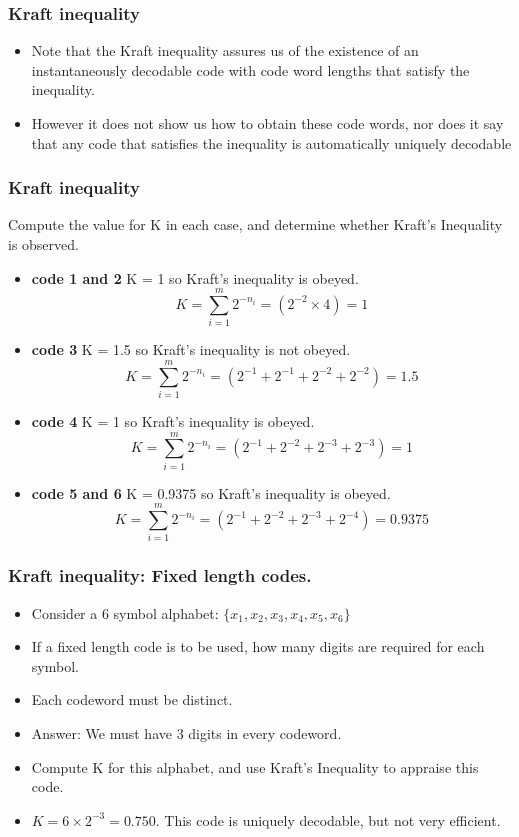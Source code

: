 \documentclass[a4]{beamer}
\begin{document}
\begin{frame}
\frametitle{Kraft inequality}
\begin{itemize}
\item Note that the Kraft inequality assures us of the existence of an instantaneously decodable code
with code word lengths that satisfy the inequality. \item However it does not show us how to obtain these code
words, nor does it say that any code that satisfies the inequality is automatically uniquely decodable
\end{itemize}
\end{frame}




\begin{frame}
\frametitle{Kraft inequality}
Compute the value for K in each case, and determine whether Kraft's Inequality is observed.
\begin{itemize}
\item \textbf{code 1 and 2} K = 1 so Kraft's inequality is obeyed.  \[ K = \sum^{m}_{i=1}2^{-n_i} = (2^{-2} \times 4) = 1 \]
\item \textbf{code 3} K = 1.5 so Kraft's inequality is not obeyed.   \[ K = \sum^{m}_{i=1}2^{-n_i} = (2^{-1} + 2^{-1} + 2^{-2} + 2^{-2}) = 1.5 \]
\item \textbf{code 4 } K = 1 so Kraft's inequality is obeyed.   \[ K = \sum^{m}_{i=1}2^{-n_i} = (2^{-1} + 2^{-2} + 2^{-3} + 2^{-3}) = 1 \]

\item \textbf{code 5 and 6 } K =  0.9375 so Kraft's inequality is obeyed.   \[ K = \sum^{m}_{i=1}2^{-n_i} = (2^{-1} + 2^{-2} + 2^{-3} + 2^{-4}) =  0.9375 \]
\end{itemize}
\end{frame}

\begin{frame}
\frametitle{Kraft inequality: Fixed length codes.}
\begin{itemize}
\item Consider a 6 symbol alphabet: $\{x_1, x_2, x_3, x_4, x_5,x_6\}$
\item If a fixed length code is to be used, how many digits are required for each symbol.
\item Each codeword must be distinct.
\item Answer: We must have 3 digits in every codeword.
\item Compute K for this alphabet, and use Kraft's Inequality to appraise this code.
\item $K = 6 \times 2^{-3} = 0.750$. This code is uniquely decodable, but not very efficient.
\end{itemize}
\end{frame}


\end{document}
